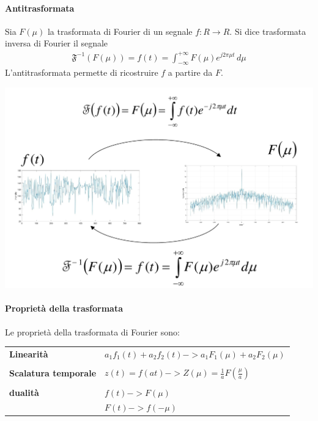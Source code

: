 \documentclass[a4paper, 10pt]{report}
\begin{document}
\paragraph*{Antitrasformata} Sia $F(\mu)$ la trasformata di Fourier di un segnale $f: R \rightarrow R$. Si dice trasformata inversa di Fourier il segnale 
\begin{align*}
\mathfrak{F}^{-1}(F(\mu)) = f(t) = \int_{-\infty}^{+\infty} F(\mu)e^{j2\pi \mu t} \, d\mu
\end{align*}
\noindent L'antitrasformata permette di ricostruire $f$ a partire da $F$.

\begin{center}
\includegraphics[scale=0.4]{1.pdf}
\end{center}

\paragraph*{Proprietà della trasformata} Le proprietà della trasformata di Fourier sono:
\begin{longtable}{ p{}  p{} }
\textbf{Linearità} & $a_1f_1(t) + a_2f_2(t) -> a_1F_1(\mu) + a_2F_2(\mu)$ 
\\\\
\textbf{Scalatura temporale} & $z(t) = f(at) -> Z(\mu) = \frac{1}{a}F(\frac{\mu}{a})$
\\\\
\textbf{dualità} & $f(t) -> F(\mu)$
\\
 & $F(t) -> f(-\mu)$
\end{longtable}
\end{document}
